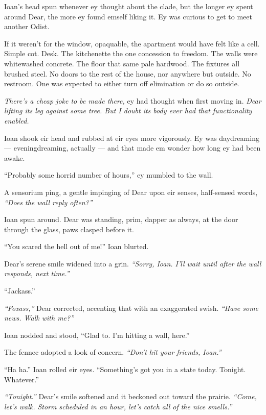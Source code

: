 Ioan's head spun whenever ey thought about the clade, but the longer ey spent around Dear, the more ey found emself liking it. Ey was curious to get to meet another Odist.

If it weren't for the window, opaquable, the apartment would have felt like a cell. Simple cot. Desk. The kitchenette the one concession to freedom. The walls were whitewashed concrete. The floor that same pale hardwood. The fixtures all brushed steel. No doors to the rest of the house, nor anywhere but outside. No restroom. One was expected to either turn off elimination or do so outside.

\emph{There's a cheap joke to be made there,} ey had thought when first moving in. \emph{Dear lifting its leg against some tree. But I doubt its body ever had that functionality enabled.}

Ioan shook eir head and rubbed at eir eyes more vigorously. Ey was daydreaming — eveningdreaming, actually — and that made em wonder how long ey had been awake.

``Probably some horrid number of hours,'' ey mumbled to the wall.

A sensorium ping, a gentle impinging of Dear upon eir senses, half-sensed words, \emph{``Does the wall reply often?''}

Ioan spun around. Dear was standing, prim, dapper as always, at the door through the glass, paws clasped before it.

``You scared the hell out of me!'' Ioan blurted.

Dear's serene smile widened into a grin. \emph{``Sorry, Ioan. I'll wait until after the wall responds, next time.''}

``Jackass.''

\emph{``Foxass,''} Dear corrected, accenting that with an exaggerated swish. \emph{``Have some news. Walk with me?''}

Ioan nodded and stood, ``Glad to. I'm hitting a wall, here.''

The fennec adopted a look of concern. \emph{``Don't hit your friends, Ioan.''}

``Ha ha.'' Ioan rolled eir eyes. ``Something's got you in a state today. Tonight. Whatever.''

\emph{``Tonight.''} Dear's smile softened and it beckoned out toward the prairie. \emph{``Come, let's walk. Storm scheduled in an hour, let's catch all of the nice smells.''}
